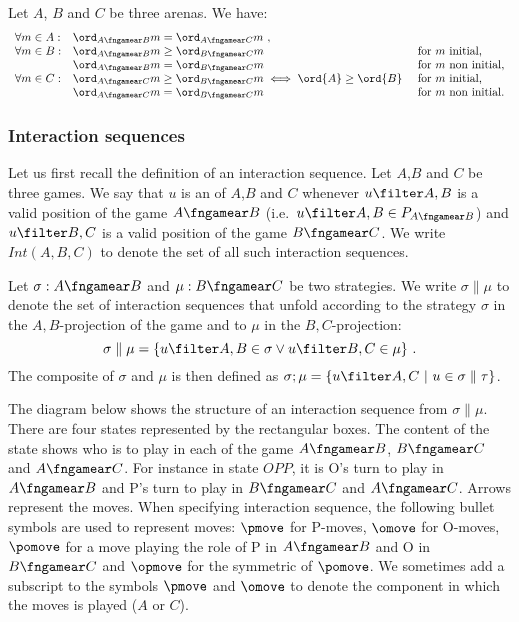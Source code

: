 \begin{lemma}
\label{lem:compositionorder}
Let $A$, $B$ and $C$ be three arenas. We have:
$$\begin{array}{lll}
\forall m \in A:
    &  \ord_{A\fngamear B}{m} = \ord_{A\fngamear C}{m} \ ,\\
\forall m \in B:
    & \ord_{A\fngamear B}{m} \geq \ord_{B\fngamear C}{m}  & \mbox{for $m$ initial,}\\
    & \ord_{A\fngamear B}{m} = \ord_{B\fngamear C}{m} & \mbox{for $m$ non initial,} \\
\forall m \in C:
    & \ord_{A\fngamear C}{m} \geq \ord_{B\fngamear C}{m} \iff
\ord{A} \geq \ord{B}\ & \mbox{for $m$ initial,}\\
    & \ord_{A\fngamear C}{m} = \ord_{B\fngamear C}{m}   & \mbox{for $m$ non initial.}
\end{array}
$$
\end{lemma}





\subsubsection{Interaction sequences}
Let us first recall the definition of an interaction sequence.
Let $A$,$B$ and $C$ be three games. 
We say that $u$  is an  of $A$,$B$ and $C$ whenever $u\filter A,B$ is a valid position of the game $A\fngamear B$
(i.e.~$u\filter A,B \in P_{A\fngamear B}$) 
and  $u\filter B,C$ is a valid position of the game
$B\fngamear C$. We write $Int(A,B,C)$ to denote
the set of all such interaction sequences.

Let $\sigma:A\fngamear B$ and $\mu:B\fngamear C$
be two strategies. We write $\sigma \parallel \mu$ to denote the 
set of interaction sequences that unfold according to the strategy $\sigma$ in the $A,B$-projection of the game and 
to $\mu$ in the $B,C$-projection:
$$ \sigma \parallel \mu = \{ u\filter A,B \in \sigma \vee u \filter B,C \in \mu \} \ .$$
The composite of $\sigma$ and $\mu$ is then defined as $\sigma ; \mu = \{ u \filter A,C \ | \ u \in \sigma \parallel \tau \}$.

The diagram below shows the structure of an interaction sequence
from $\sigma \parallel \mu$. There are four states represented by the rectangular boxes. The content of the state shows who is to play in each of the game $A\fngamear B$, $B\fngamear C$ and $A\fngamear C$.
For instance in state $OPP$, it is O's turn to play in 
$A\fngamear B$ and P's turn to play in $B\fngamear C$ and $A\fngamear C$. Arrows represent the moves.
When specifying interaction sequence,
the following bullet symbols are used to represent moves:
$\pmove$ for P-moves, $\omove$ for O-moves, $\pomove$ 
for a move playing the role of P in $A\fngamear B$
and O in $B\fngamear C$ and $\opmove$ for
the symmetric of $\pomove$.
We sometimes add a subscript to the symbols $\pmove$ and $\omove$ to denote the component in which the moves is played ($A$ or $C$).


